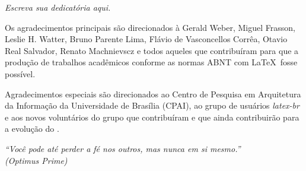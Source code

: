 \documentclass[
	12pt,				%
	openright,			%
	oneside,			%
	a4paper,			%
	english,			%
	brazil				%
	]{abntex2}
\begin{document}
\begin{dedicatoria}
   \vspace*{\fill}
   \centering
   \noindent
   \textit{ Escreva sua dedicatória aqui.} \vspace*{\fill}
\end{dedicatoria}

\begin{agradecimentos}
Os agradecimentos principais são direcionados à Gerald Weber, Miguel Frasson,
Leslie H. Watter, Bruno Parente Lima, Flávio de Vasconcellos Corrêa, Otavio Real
Salvador, Renato Machnievscz e todos aqueles que
contribuíram para que a produção de trabalhos acadêmicos conforme
as normas ABNT com \LaTeX\ fosse possível.

Agradecimentos especiais são direcionados ao Centro de Pesquisa em Arquitetura
da Informação da Universidade de
Brasília (CPAI), ao grupo de usuários
\emph{latex-br} e aos
novos voluntários do grupo
\emph{\abnTeX} que contribuíram e que ainda
contribuirão para a evolução do \abnTeX.

\end{agradecimentos}

\begin{epigrafe}
    \vspace*{\fill}
	\begin{flushright}
		\textit{``Você pode até perder a fé nos outros, mas nunca em si mesmo.''\\
		(Optimus Prime)}
	\end{flushright}
\end{epigrafe}

\end{document}
